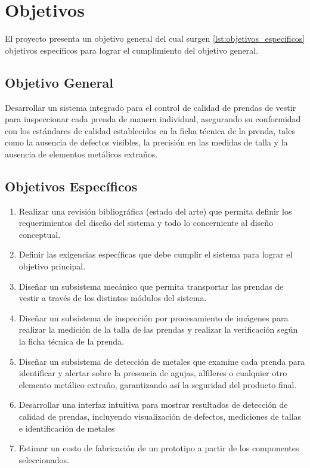 \section{Objetivos}

El proyecto presenta un objetivo general del cual surgen \ref{lst:objetivos_especificos} objetivos específicos para lograr el cumplimiento del objetivo general.

\subsection{Objetivo General}

Desarrollar un sistema integrado para el control de calidad de prendas de vestir para inspeccionar cada prenda de manera individual, asegurando su conformidad con los estándares de calidad establecidos en la ficha técnica de la prenda, tales como la ausencia de defectos visibles, la precisión en las medidas de talla y la ausencia de elementos metálicos extraños.

\subsection{Objetivos Específicos}

\begin{enumerate}
	\setlength\itemsep{-0.5em}
	\item Realizar una revisión bibliográfica (estado del arte) que permita definir los requerimientos del diseño del sistema y todo lo concerniente al diseño conceptual.
	
	\item Definir las exigencias específicas que debe cumplir el sistema para lograr el objetivo principal.
	
	\item Diseñar un subsistema mecánico que permita transportar las prendas de vestir a través de los distintos módulos del sistema.
	
	\item Diseñar un subsistema de inspección por procesamiento de imágenes para realizar la medición de la talla de las prendas y realizar la verificación según la ficha técnica de la prenda.
	
	\item Diseñar un subsistema de detección de metales que examine cada prenda para identificar y alertar sobre la presencia de agujas, alfileres o cualquier otro elemento metálico extraño, garantizando así la seguridad del producto final.
	
	\item Desarrollar una interfaz intuitiva para mostrar resultados de detección de calidad de prendas, incluyendo visualización de defectos, mediciones de tallas e identificación de metales
	
	\item Estimar un costo de fabricación de un prototipo a partir de los componentes seleccionados.
	
	\label{lst:objetivos_especificos}
\end{enumerate}

